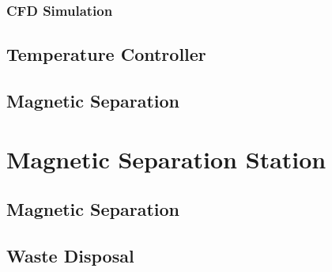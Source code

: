

\subsubsection{CFD Simulation}

\subsection{Temperature Controller}

\subsection{Magnetic Separation}

\section{Magnetic Separation Station}

\subsection{Magnetic Separation}

\subsection{Waste Disposal}
